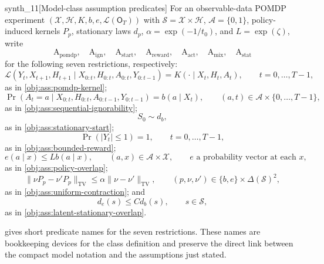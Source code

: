 \documentclass[11pt]{article}
\begin{document}
\begin{definitionv}{synth_11}[Model-class assumption predicates]
For an observable-data POMDP experiment \((\mathcal X,\mathcal H,K,b,e,\mathcal L(\mathsf O_T))\) with \(\mathcal S=\mathcal X\times\mathcal H\), \(\mathcal A=\{0,1\}\), policy-induced kernels \(P_p\), stationary laws \(d_p\), \(\alpha=\exp(-1/t_0)\), and \(L=\exp(\zeta)\), write
\[
\mathrm A_{\mathrm{pomdp}},\quad
\mathrm A_{\mathrm{ign}},\quad
\mathrm A_{\mathrm{start}},\quad
\mathrm A_{\mathrm{reward}},\quad
\mathrm A_{\mathrm{act}},\quad
\mathrm A_{\mathrm{mix}},\quad
\mathrm A_{\mathrm{stat}}
\]
for the following seven restrictions, respectively:
\[
\mathcal L(Y_t,X_{t+1},H_{t+1}\mid X_{0:t},H_{0:t},A_{0:t},Y_{0:t-1})
=
K(\cdot\mid X_t,H_t,A_t),
\qquad t=0,\ldots,T-1,
\]
as in \cref{obj:ass:pomdp-kernel};
\[
\Pr(A_t=a\mid X_{0:t},H_{0:t},A_{0:t-1},Y_{0:t-1})
=
b(a\mid X_t),
\qquad (a,t)\in\mathcal A\times\{0,\ldots,T-1\},
\]
as in \cref{obj:ass:sequential-ignorability};
\[
S_0\sim d_b,
\]
as in \cref{obj:ass:stationary-start};
\[
\Pr(|Y_t|\le1)=1,
\qquad t=0,\ldots,T-1,
\]
as in \cref{obj:ass:bounded-reward};
\[
e(a\mid x)\le L b(a\mid x),
\qquad (a,x)\in\mathcal A\times\mathcal X,
\qquad e\text{ a probability vector at each }x,
\]
as in \cref{obj:ass:policy-overlap};
\[
\|\nu P_p-\nu'P_p\|_{\mathrm{TV}}
\le
\alpha\|\nu-\nu'\|_{\mathrm{TV}},
\qquad (p,\nu,\nu')\in\{b,e\}\times\Delta(\mathcal S)^2,
\]
as in \cref{obj:ass:uniform-contraction}; and
\[
d_e(s)\le C d_b(s),
\qquad s\in\mathcal S,
\]
as in \cref{obj:ass:latent-stationary-overlap}.
\end{definitionv}

 gives short predicate names for the seven restrictions. These names are bookkeeping devices for the class definition and preserve the direct link between the compact model notation and the assumptions just stated.
\end{document}
